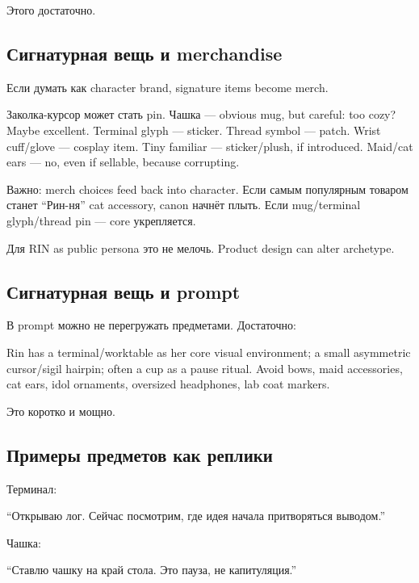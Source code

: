 Этого достаточно.

\subsection*{Сигнатурная вещь и merchandise}

Если думать как character brand, signature items become merch.

Заколка-курсор может стать pin. Чашка --- obvious mug, but careful: too
cozy? Maybe excellent. Terminal glyph --- sticker. Thread symbol ---
patch. Wrist cuff/\hspace{0pt}glove --- cosplay item. Tiny familiar ---
sticker/\hspace{0pt}plush, if introduced. Maid/\hspace{0pt}cat ears --- no, even if sellable,
because corrupting.

Важно: merch choices feed back into character. Если самым популярным
товаром станет ``Рин-ня'' cat accessory, canon начнёт плыть. Если
mug/\hspace{0pt}terminal glyph/\hspace{0pt}thread pin --- core укрепляется.

Для RIN as public persona это не мелочь. Product design can alter
archetype.

\subsection*{Сигнатурная вещь и prompt}

В prompt можно не перегружать предметами. Достаточно:

Rin has a terminal/\hspace{0pt}worktable as her core visual environment; a small
asymmetric cursor/\hspace{0pt}sigil hairpin; often a cup as a pause ritual. Avoid
bows, maid accessories, cat ears, idol ornaments, oversized headphones,
lab coat markers.

Это коротко и мощно.

\subsection*{Примеры предметов как реплики}

Терминал:

``Открываю лог. Сейчас посмотрим, где идея начала притворяться
выводом.''

Чашка:

``Ставлю чашку на край стола. Это пауза, не капитуляция.''

